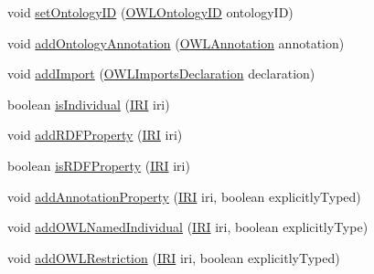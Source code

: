 \begin{DoxyCompactItemize}
\item 
void \hyperlink{classorg_1_1coode_1_1owlapi_1_1rdfxml_1_1parser_1_1_o_w_l_r_d_f_consumer_aa07bcbe9440177ff91b6ba3d62f3f21a}{set\-Ontology\-I\-D} (\hyperlink{classorg_1_1semanticweb_1_1owlapi_1_1model_1_1_o_w_l_ontology_i_d}{O\-W\-L\-Ontology\-I\-D} ontology\-I\-D)
\item 
void \hyperlink{classorg_1_1coode_1_1owlapi_1_1rdfxml_1_1parser_1_1_o_w_l_r_d_f_consumer_a1cca22d216b605b8ba1e53b03a0fe47f}{add\-Ontology\-Annotation} (\hyperlink{interfaceorg_1_1semanticweb_1_1owlapi_1_1model_1_1_o_w_l_annotation}{O\-W\-L\-Annotation} annotation)
\item 
void \hyperlink{classorg_1_1coode_1_1owlapi_1_1rdfxml_1_1parser_1_1_o_w_l_r_d_f_consumer_ab0f4c2c25ea78013b99ef9db1cf25e5a}{add\-Import} (\hyperlink{interfaceorg_1_1semanticweb_1_1owlapi_1_1model_1_1_o_w_l_imports_declaration}{O\-W\-L\-Imports\-Declaration} declaration)
\item 
boolean \hyperlink{classorg_1_1coode_1_1owlapi_1_1rdfxml_1_1parser_1_1_o_w_l_r_d_f_consumer_a14079922f324871d1ad9b534440b097d}{is\-Individual} (\hyperlink{classorg_1_1semanticweb_1_1owlapi_1_1model_1_1_i_r_i}{I\-R\-I} iri)
\item 
void \hyperlink{classorg_1_1coode_1_1owlapi_1_1rdfxml_1_1parser_1_1_o_w_l_r_d_f_consumer_ad5be0d133dba93f3f70279a64de33457}{add\-R\-D\-F\-Property} (\hyperlink{classorg_1_1semanticweb_1_1owlapi_1_1model_1_1_i_r_i}{I\-R\-I} iri)
\item 
boolean \hyperlink{classorg_1_1coode_1_1owlapi_1_1rdfxml_1_1parser_1_1_o_w_l_r_d_f_consumer_abb5f5e30ae0bcc6ec77fdde641367f3c}{is\-R\-D\-F\-Property} (\hyperlink{classorg_1_1semanticweb_1_1owlapi_1_1model_1_1_i_r_i}{I\-R\-I} iri)
\item 
void \hyperlink{classorg_1_1coode_1_1owlapi_1_1rdfxml_1_1parser_1_1_o_w_l_r_d_f_consumer_ae660c1ee6741d323e5a240b590de5fcf}{add\-Annotation\-Property} (\hyperlink{classorg_1_1semanticweb_1_1owlapi_1_1model_1_1_i_r_i}{I\-R\-I} iri, boolean explicitly\-Typed)
\item 
void \hyperlink{classorg_1_1coode_1_1owlapi_1_1rdfxml_1_1parser_1_1_o_w_l_r_d_f_consumer_a01f9b460a5a3435533aa843874ecefcb}{add\-O\-W\-L\-Named\-Individual} (\hyperlink{classorg_1_1semanticweb_1_1owlapi_1_1model_1_1_i_r_i}{I\-R\-I} iri, boolean explicitly\-Type)
\item 
void \hyperlink{classorg_1_1coode_1_1owlapi_1_1rdfxml_1_1parser_1_1_o_w_l_r_d_f_consumer_a5ddcad23844f36a0e6e5026751122d0c}{add\-O\-W\-L\-Restriction} (\hyperlink{classorg_1_1semanticweb_1_1owlapi_1_1model_1_1_i_r_i}{I\-R\-I} iri, boolean explicitly\-Typed)

\end{DoxyCompactItemize}
